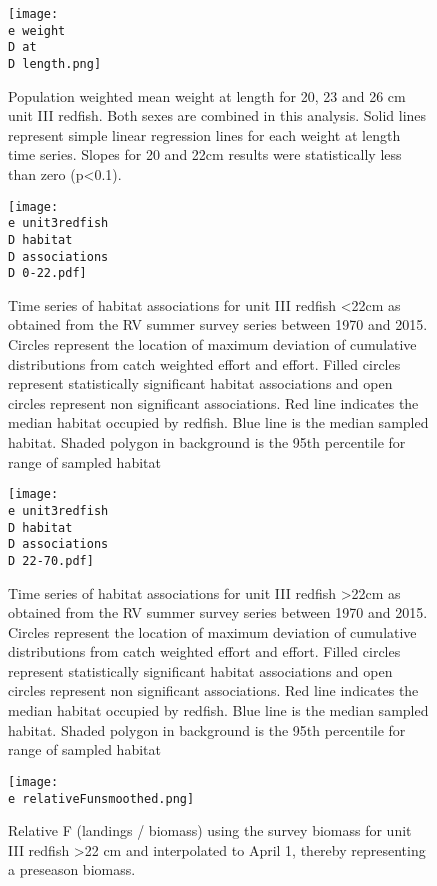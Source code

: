 \documentclass[11pt]{article}
\newcommand{\D}{.}
\newcommand{\e}{/home/ecomod_data/redfish/figures/}
\begin{document}
\begin{figure}
\centering
    
    \texttt{[image: \\e weight\\D at\\D length.png]}
    \caption{Population weighted mean weight at length for 20, 23 and 26 cm unit III redfish. Both sexes are combined in this analysis. Solid lines represent simple linear regression lines for each weight at length time series. Slopes for 20 and 22cm results were statistically less than zero (p\textless 0.1). }

\end{figure}
\clearpage

\begin{figure}
\centering
    
    \texttt{[image: \\e unit3redfish\\D habitat\\D associations\\D 0-22.pdf]}
    \caption{Time series of habitat associations for unit III redfish \textless 22cm as obtained from the RV summer survey
series between 1970 and 2015. Circles represent the location of maximum deviation of
cumulative distributions from catch weighted effort and effort. Filled circles represent statistically
significant habitat associations and open circles represent non significant associations. Red line indicates
the median habitat occupied by redfish. Blue line is the median sampled habitat. Shaded polygon in
background is the 95th percentile for range of sampled habitat}
\end{figure}
\clearpage

\begin{figure}
\centering
    
    \texttt{[image: \\e unit3redfish\\D habitat\\D associations\\D 22-70.pdf]}
    \caption{Time series of habitat associations for unit III redfish \textgreater 22cm as obtained from the RV summer survey
series between 1970 and 2015. Circles represent the location of maximum deviation of
cumulative distributions from catch weighted effort and effort. Filled circles represent statistically
significant habitat associations and open circles represent non significant associations. Red line indicates
the median habitat occupied by redfish. Blue line is the median sampled habitat. Shaded polygon in
background is the 95th percentile for range of sampled habitat}
\end{figure}
\clearpage

\begin{figure}
\centering
    
    \texttt{[image: \\e relativeFunsmoothed.png]}
    \caption{Relative F (landings / biomass) using the survey biomass for unit III redfish \textgreater 22 cm and interpolated to April 1, thereby representing a preseason biomass.}

\end{figure}
\clearpage
\end{document}
